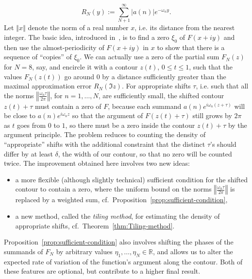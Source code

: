 \documentclass[oneside,english]{amsart}
\numberwithin{equation}{section}
\numberwithin{figure}{section}
\theoremstyle{plain}
\theoremstyle{plain}
\theoremstyle{plain}
\theoremstyle{definition}
\begin{document}
\begin{equation}
R_{N}(y):=\sum_{N+1}^{\infty}|a(n)|e^{-\omega_{n}y}.\label{eq:R_N}
\end{equation}
Let $\left\Vert x\right\Vert $ denote the norm of a real number $x$,
i.e. its distance from the nearest integer. The basic idea, introduced
in~\cite[pp. 54–55]{Kaczorowski1991}, is to find a zero $\xi_{0}$
of $F(x+iy)$ and then use the almost-periodicity of $F(x+iy)$ in
$x$ to show that there is a sequence of ``copies'' of $\xi_{0}$.
We can actually use a zero of the partial sum $F_{N}(z)$ for $N=8$,
say, and encircle it with a contour $z(t)$, $0\leq t\leq1$, such
that the values $F_{N}(z(t))$ go around $0$ by a distance sufficiently
greater than the maximal approximation error $R_{N}(\Im z)$. For
appropriate shifts $\tau$, i.e. such that all the norms $\left\Vert \frac{\omega_{n}\tau}{2\pi}\right\Vert $,
for $n=1,\dotsc,N$, are sufficiently small, the shifted contour $z(t)+\tau$
must contain a zero of $F$, because each summand $a(n)e^{i\omega_{n}(z+\tau)}$
will be close to $a(n)e^{i\omega_{n}z}$ so that the argument of $F(z(t)+\tau)$
still grows by $2\pi$ as $t$ goes from $0$ to $1$, so there must
be a zero inside the contour $z(t)+\tau$ by the argument principle.
The problem reduces to counting the density of ``appropriate'' shifts
with the additional constraint that the distinct $\tau$'s should
differ by at least $\delta$, the width of our contour, so that no
zero will be counted twice. The improvement obtained here involves
two new ideas:
\begin{itemize}
\item [$(i)$] a more flexible (although slightly technical) sufficient
condition for the shifted contour to contain a zero, where the uniform
bound on the norms $\left\Vert \frac{\omega_{n}\tau}{2\pi}\right\Vert $
is replaced by a weighted sum, cf.~Proposition~\ref{prop:sufficient-condition},
\item [$(ii)$] a new method, called the \emph{tiling method}, for estimating
the density of appropriate shifts, cf.~Theorem~\ref{thm:Tiling-method}.
\end{itemize}
Proposition~\ref{prop:sufficient-condition} also involves shifting
the phases of the summands of $F_{N}$ by arbitrary values $\eta_{1},\dotsc,\eta_{N}\in\mathbb{R}$,
and allows us to alter the expected rate of variation of the function's
argument along the contour. Both of these features are optional, but
contribute to a higher final result.
\end{document}
